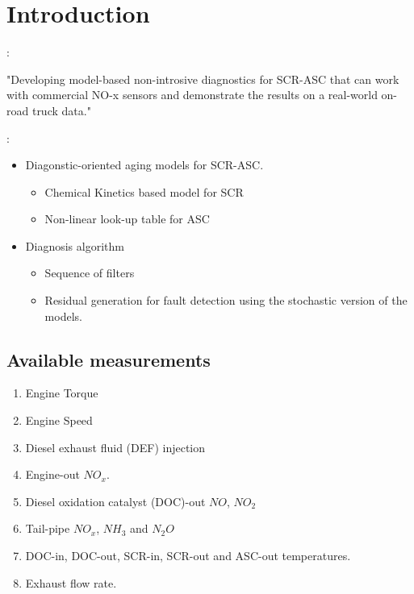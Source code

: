 \section{Introduction}

:

"Developing model-based non-introsive diagnostics for SCR-ASC that can work with commercial NO-x sensors and demonstrate the results on a real-world on-road truck data."

\bigskip

:
\begin{itemize}
    \item Diagonstic-oriented aging models for SCR-ASC.
    \begin{itemize}
        \item Chemical Kinetics based model for SCR
        \item Non-linear look-up table for ASC
    \end{itemize}
    \item Diagnosis algorithm
    \begin{itemize}
        \item Sequence of filters
        \item Residual generation for fault detection using the stochastic version of the models.
    \end{itemize}
\end{itemize}

\subsection{Available measurements}
\begin{enumerate}
    \item Engine Torque
    \item Engine Speed
    \item Diesel exhaust fluid (DEF) injection
    \item Engine-out $NO_x$.
    \item Diesel oxidation catalyst (DOC)-out $NO$, $NO_2$
    \item Tail-pipe $NO_x$, $NH_3$ and $N_2O$
    \item DOC-in, DOC-out, SCR-in, SCR-out and ASC-out temperatures.
    \item Exhaust flow rate.
\end{enumerate}

